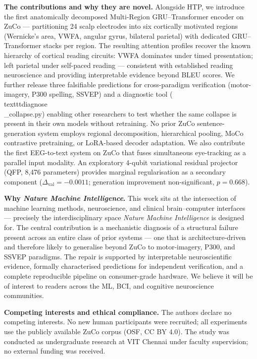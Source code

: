 \documentclass[12pt]{article}
\begin{document}
\textbf{The contributions and why they are novel.}
Alongside HTP, we introduce the first anatomically decomposed Multi-Region
GRU--Transformer encoder on ZuCo — partitioning 24 scalp electrodes into
six cortically motivated regions (Wernicke's area, VWFA, angular gyrus,
bilateral parietal) with dedicated GRU--Transformer stacks per region.
The resulting attention profiles recover the known hierarchy of cortical
reading circuits: VWFA dominates under timed presentation; left parietal
under self-paced reading — consistent with established reading neuroscience
and providing interpretable evidence beyond BLEU scores.
We further release three falsifiable predictions for cross-paradigm
verification (motor-imagery, P300 spelling, SSVEP) and a diagnostic
tool (\\texttt{diagnose\\_collapse.py}) enabling other researchers to test
whether the same collapse is present in their own models without retraining.
No prior ZuCo sentence-generation system employs regional decomposition,
hierarchical pooling, MoCo contrastive pretraining, or LoRA-based decoder
adaptation.
We also contribute the first EEG-to-text system on ZuCo that fuses
simultaneous eye-tracking as a parallel input modality.
An exploratory 4-qubit variational residual projector (QFP, 8,476 parameters)
provides marginal regularisation as a secondary component
($\Delta_\text{val}{=}{-}0.0011$; generation improvement non-significant,
$p{=}0.668$).

\textbf{Why \textit{Nature Machine Intelligence}.}
This work sits at the intersection of machine learning methods, neuroscience,
and clinical brain--computer interfaces — precisely the interdisciplinary space
\textit{Nature Machine Intelligence} is designed for.
The central contribution is a mechanistic diagnosis of a structural failure
present across an entire class of prior systems — one that is architecture-driven
and therefore likely to generalise beyond ZuCo to motor-imagery, P300, and
SSVEP paradigms.
The repair is supported by interpretable neuroscientific evidence,
formally characterised predictions for independent verification, and a
complete reproducible pipeline on consumer-grade hardware.
We believe it will be of interest to readers across the ML, BCI, and
cognitive neuroscience communities.

\textbf{Competing interests and ethical compliance.}
The authors declare no competing interests.
No new human participants were recruited; all experiments use the
publicly available ZuCo corpus (OSF, CC BY 4.0).
The study was conducted as undergraduate research at VIT Chennai under
faculty supervision; no external funding was received.
\end{document}

